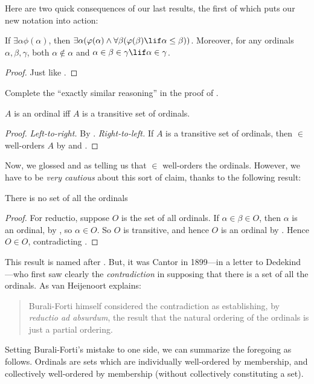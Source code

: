 \documentclass[../../../include/open-logic-section]{subfiles}
\begin{document}
Here are two quick consequences of our last results, the first of
which puts our new notation into action:

\begin{cor}
If $\exists \alpha\phi(\alpha)$, then $\exists \alpha(\phi(\alpha)
\land \forall \beta(\phi(\beta) \lif \alpha \leq \beta))$.
Moreover, for any ordinals $\alpha, \beta, \gamma$, both $\alpha
\notin \alpha$ and $\alpha \in \beta \in \gamma \lif \alpha \in
\gamma$. 
\end{cor}

\begin{proof}
Just like .
\end{proof}

\begin{prob}
Complete the ``exactly similar reasoning'' in the proof of
.
\end{prob}

\begin{cor}
$A$ is an ordinal iff $A$ is a transitive set of ordinals.
\end{cor}

\begin{proof}
\emph{Left-to-right.} By . \emph{Right-to-left.}
If $A$ is a transitive set of ordinals, then $\in$ well-orders $A$ by
 and .
\end{proof}

Now, we glossed 
 and  as telling us that $\in$ well-orders the ordinals. However, we 
have to be \emph{very cautious} about this sort of claim, thanks to the
following result:

\begin{thm}
There is no set of all the ordinals
\end{thm}

\begin{proof}
For reductio, suppose $O$ is the set of all ordinals. If $\alpha \in
\beta \in O$, then $\alpha$ is an ordinal, by , so
$\alpha \in O$. So $O$ is transitive, and hence $O$ is an ordinal by
. Hence $O \in O$, contradicting
. 
\end{proof}
\noindent
This result is named after \citeauthor{Burali-Forti1897}. But, it was Cantor in 1899---in a letter to Dedekind---who first saw
clearly the \emph{contradiction} in supposing that there is a set of
all the ordinals. As van
Heijenoort explains:
\begin{quote}
  Burali-Forti himself considered the contradiction as establishing,
  by \emph{reductio ad absurdum}, the result that the natural ordering
  of the ordinals is just a partial ordering.
  \citep[p.~105]{Heijenoort1967}
\end{quote}
Setting Burali-Forti's mistake to one side, we can summarize the foregoing as follows. Ordinals are sets which are individually well-ordered by
membership, and collectively well-ordered by membership (without collectively constituting a set). 
\end{document}
